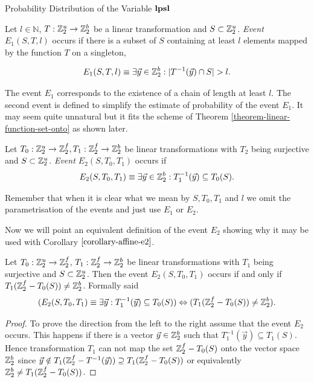 \begin{section}{Probability Distribution of the Variable \texorpdfstring{$\mathbf{lpsl}$}{lpsl}}
\begin{definition}[Event $E_1(S, T, l)$]
Let $l \in \mathbb{N}$, $T: \mathbb{Z}_{2}^{u} \rightarrow \mathbb{Z}_{2}^{b}$ be a linear transformation and $S \subset \mathbb{Z}_{2}^{u}$. \emph{Event $E_1(S, T, l)$} occurs if there is a subset of $S$ containing at least $l$ elements mapped by the function $T$ on a singleton,

\[ 
	E_1(S, T, l) \equiv \exists \vec{y} \in \mathbb{Z}_{2}^{b}: | T^{-1}(\vec{y}) \cap S | > l \text{.}
\]
\end{definition}
The event $E_1$ corresponds to the existence of a chain of length at least $l$. The second event is defined to simplify the estimate of probability of the event $E_1$. It may seem quite unnatural but it fits the scheme of Theorem \ref{theorem-linear-function-set-onto} as shown later.
\begin{definition}[Event $E_2(S, T_0, T_1)$]
Let $T_0: \mathbb{Z}_{2}^{u} \rightarrow \mathbb{Z}_{2}^{f}, T_1: \mathbb{Z}_{2}^{f} \rightarrow \mathbb{Z}_{2}^{b}$ be linear transformations with $T_2$ being surjective and $S \subset \mathbb{Z}_{2}^{u}$. \emph{Event $E_2(S, T_0, T_1)$} occurs if
\[
	E_2(S, T_0, T_1) \equiv \exists \vec{y} \in \mathbb{Z}_{2}^{b}: T_1^{-1}(\vec{y}) \subseteq T_0(S) \text{.}
\]
\end{definition}

Remember that when it is clear what we mean by $S, T_0, T_1$ and $l$ we omit the parametrisation of the events and just use $E_1$ or $E_2$.

Now we will point an equivalent definition of the event $E_2$ showing why it may be used with Corollary $\ref{corollary-affine-e2}$.
\begin{remark}
\label{remark-e2-equivalency}
Let $T_0: \mathbb{Z}_{2}^{u} \rightarrow \mathbb{Z}_{2}^{f}$, $T_1: \mathbb{Z}_{2}^{f} \rightarrow \mathbb{Z}_{2}^{b}$ be linear transformations with $T_1$ being surjective and $S \subset \mathbb{Z}_{2}^{u}$. Then the event $E_2(S, T_0, T_1)$ occurs if and only if $T_1(\mathbb{Z}_{2}^{f} - T_0(S)) \neq \mathbb{Z}_{2}^{b}$. Formally said
\[
	(E_2(S, T_0, T_1) \equiv \exists \vec{y}: T_1^{-1}(\vec{y}) \subseteq T_0(S)) \Leftrightarrow (T_1(\mathbb{Z}_{2}^{f} - T_0(S)) \neq \mathbb{Z}_{2}^{b}) \text{.}
\]
\end{remark}
\begin{proof}
To prove the direction from the left to the right assume that the event $E_2$ occurs. This happens if there is a vector $\vec{y} \in \mathbb{Z}_{2}^{b}$ such that $T_1^{-1}(\vec{y}) \subseteq T_1(S)$. Hence transformation $T_1$ can not map the set $\mathbb{Z}_{2}^{f} - T_0(S)$ onto the vector space $\mathbb{Z}_{2}^{b}$ since $\vec{y} \notin T_1(\mathbb{Z}_{2}^{f} - T^{-1}(\vec{y})) \supseteq T_1(\mathbb{Z}_{2}^{f} - T_0(S))$ or equivalently $\mathbb{Z}_{2}^{b} \neq T_1(\mathbb{Z}_{2}^{f} - T_0(S))$.


\end{proof}
\end{section}
